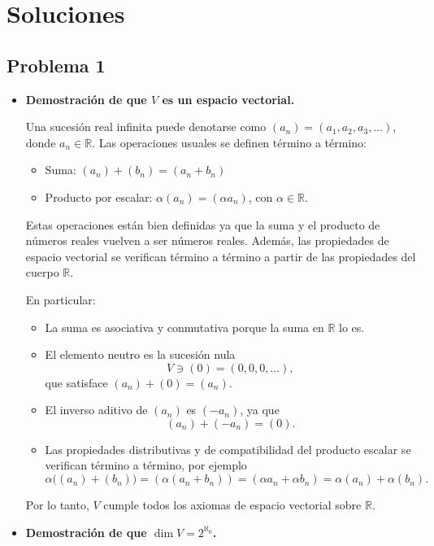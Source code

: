\documentclass[11pt,spanish]{article}
\begin{document}
\section{Soluciones}

\subsection*{Problema 1}

\begin{itemize}

\item \textbf{Demostración de que $V$ es un espacio vectorial.}

Una sucesión real infinita puede denotarse como $(a_n) = (a_1,a_2,a_3,\dots)$, donde $a_n \in \mathbb{R}$. 
Las operaciones usuales se definen término a término:

\begin{itemize}
\item Suma: $(a_n) + (b_n) = (a_n + b_n)$
\item Producto por escalar: $\alpha (a_n) = (\alpha a_n)$, con $\alpha \in \mathbb{R}$.
\end{itemize}

Estas operaciones están bien definidas ya que la suma y el producto de números reales vuelven a ser números reales. 
Además, las propiedades de espacio vectorial se verifican término a término a partir de las propiedades del cuerpo $\mathbb{R}$.

En particular:

\begin{itemize}
\item La suma es asociativa y conmutativa porque la suma en $\mathbb{R}$ lo es.
\item El elemento neutro es la sucesión nula
\[
V\ni (0)=(0,0,0,\dots),
\]
que satisface $(a_n)+(0)=(a_n)$.
\item El inverso aditivo de $(a_n)$ es $(-a_n)$, ya que
\[
(a_n)+(-a_n)=(0).
\]
\item Las propiedades distributivas y de compatibilidad del producto escalar se verifican término a término, por ejemplo
\[
\alpha\big((a_n)+(b_n)\big)
= (\alpha(a_n+b_n))
= (\alpha a_n + \alpha b_n)
= \alpha(a_n)+\alpha(b_n).
\]
\end{itemize}

Por lo tanto, $V$ cumple todos los axiomas de espacio vectorial sobre $\mathbb{R}$.

\item \textbf{Demostraci\'on de que $\dim V=2^{\aleph_0}$.}


\end{itemize}
\end{document}
